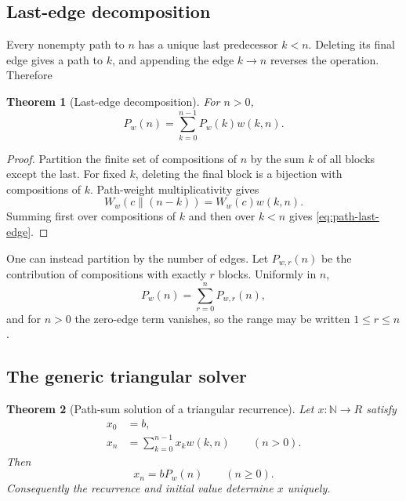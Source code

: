 \documentclass[11pt,oneside]{article}
\newtheorem{theorem}{Theorem}[section]
\theoremstyle{definition}
\theoremstyle{remark}
\newcommand{\N}{\mathbb N}
\begin{document}
\subsection{Last-edge decomposition}

Every nonempty path to $n$ has a unique last predecessor $k<n$.  Deleting its final edge
gives a path to $k$, and appending the edge $k\to n$ reverses the operation.  Therefore

\begin{theorem}[Last-edge decomposition]
\label{thm:path-last-edge}
For $n>0$,
\begin{equation}
 P_w(n)=\sum_{k=0}^{n-1}P_w(k)w(k,n).
 \label{eq:path-last-edge}
\end{equation}
\end{theorem}

\begin{proof}
Partition the finite set of compositions of $n$ by the sum $k$ of all blocks except the last.
For fixed $k$, deleting the final block is a bijection with compositions of $k$.  Path-weight
multiplicativity gives
\[
 W_w(c\mathbin{\|}(n-k))=W_w(c)w(k,n).
\]
Summing first over compositions of $k$ and then over $k<n$ gives
\eqref{eq:path-last-edge}.
\end{proof}

One can instead partition by the number of edges.  Let $P_{w,r}(n)$ be the contribution of
compositions with exactly $r$ blocks.  Uniformly in $n$,
\begin{equation}
 P_w(n)=\sum_{r=0}^{n}P_{w,r}(n),
 \label{eq:path-length-uniform}
\end{equation}
and for $n>0$ the zero-edge term vanishes, so the range may be written $1\le r\le n$.

\subsection{The generic triangular solver}

\begin{theorem}[Path-sum solution of a triangular recurrence]
\label{thm:triangular-path-solver}
Let $x:\N\to R$ satisfy
\begin{align}
 x_0&=b,                                                    \label{eq:triangular-initial}\\
 x_n&=\sum_{k=0}^{n-1}x_k w(k,n)\qquad(n>0).               \label{eq:triangular-recurrence}
\end{align}
Then
\begin{equation}
 x_n=bP_w(n)
 \qquad(n\ge0).
 \label{eq:triangular-path-solution}
\end{equation}
Consequently the recurrence and initial value determine $x$ uniquely.
\end{theorem}
\end{document}
